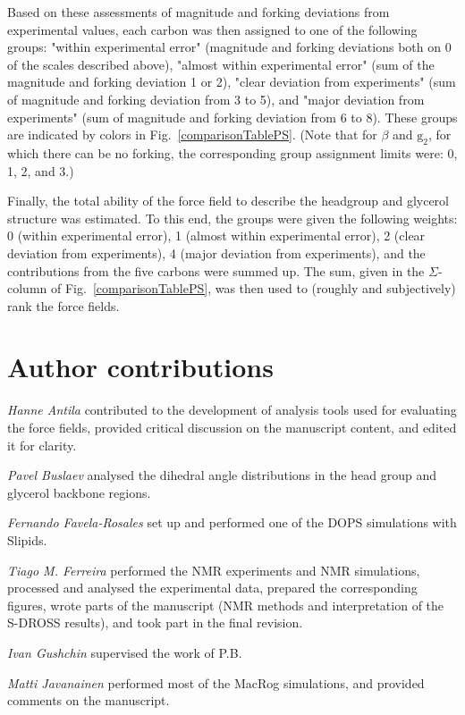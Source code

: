 \documentclass[journal=jpcbfk,manuscript=article]{achemso}
\begin{document}
\noindent Based on these assessments of magnitude and forking deviations from experimental values,
each carbon was then assigned to one of the following groups: "within experimental error"
(magnitude and forking deviations both on 0 of the scales described above),
"almost within experimental error"
(sum of the magnitude and forking deviation 1 or 2),
"clear deviation from experiments"
(sum of magnitude and forking deviation from 3 to 5), and
"major deviation from experiments"
(sum of magnitude and forking deviation from 6 to 8).
These groups are indicated by colors in Fig.~\ref{comparisonTablePS}.
(Note that for $\beta$ and $\mathrm{g_2}$, for which there can be no forking,
the corresponding group assignment limits were: 0, 1, 2, and 3.)

Finally, the total ability of the force field to describe the headgroup and
glycerol structure was estimated.
To this end, the groups were given the following weights:
0 (within experimental error),
1 (almost within experimental error),
2 (clear deviation from experiments),
4 (major deviation from experiments),
and the contributions from the five carbons were summed up.
The sum, given in the $\Sigma$-column of Fig.~\ref{comparisonTablePS},
was then used to (roughly and subjectively) rank the force fields.

\section{Author contributions}
\noindent
{\it Hanne Antila}
contributed to the development of analysis tools used for evaluating the force fields,  provided critical discussion on the manuscript content, and edited it for clarity.

\noindent
{\it Pavel Buslaev}
analysed the dihedral angle distributions in the head group and glycerol backbone regions.

\noindent
{\it Fernando Favela-Rosales}
set up and performed one of the DOPS simulations with Slipids.

\noindent
{\it Tiago M. Ferreira}
performed the NMR experiments and NMR simulations, processed and analysed the experimental data, prepared the corresponding figures, wrote parts of the manuscript (NMR methods and interpretation of the S-DROSS results), and took part in the final revision.

\noindent
{\it Ivan Gushchin}
supervised the work of P.B.

\noindent
{\it Matti Javanainen}
performed most of the MacRog simulations, and provided comments on the manuscript.
\end{document}
